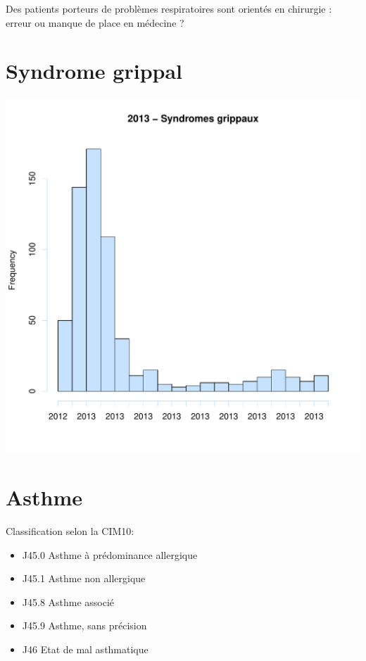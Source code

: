 \documentclass[12pt,english,french,twoside]{book}\usepackage[]{graphicx}\usepackage[]{color}
\makeatletter
\def\maxwidth{ %
  \ifdim\Gin@nat@width>\linewidth
    \linewidth
  \else
    \Gin@nat@width
  \fi
}
\newenvironment{knitrout}{}{} %
\makeatother
\begin{document}
Des patients porteurs de problèmes respiratoires sont orientés en chirurgie : erreur ou manque de place en médecine ?

\section{Syndrome grippal}

\begin{knitrout}
\color{fgcolor}
\includegraphics[width=\maxwidth]{figure/grippe-1} 

\end{knitrout}

\section{Asthme}

Classification selon la CIM10:
\begin{itemize}
  \item J45.0 Asthme à prédominance allergique
  \item J45.1 Asthme non allergique
  \item J45.8 Asthme associé 
  \item J45.9 Asthme, sans précision
  \item J46   Etat de mal asthmatique
\end{itemize}
\end{document}
